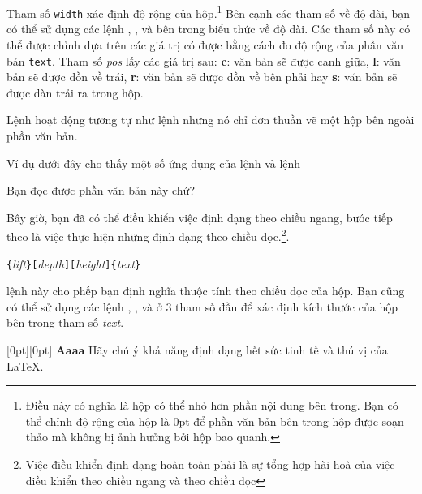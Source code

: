 \noindent Tham số \texttt{width} xác định độ rộng của
hộp.\footnote{Điều này có nghĩa là hộp có thể nhỏ hơn phần nội
dung bên trong. Bạn có thể chỉnh độ rộng của hộp là 0pt để phần
văn bản bên trong hộp được soạn thảo mà không bị ảnh hưởng bởi hộp
bao quanh.} Bên cạnh các tham số về độ dài, bạn có thể sử dụng các
lệnh , ,  và  bên
trong biểu thức về độ dài. Các tham số này có thể được chỉnh dựa
trên các giá trị có được bằng cách đo độ rộng của phần văn bản
\texttt{text}. Tham số \emph{pos} lấy các giá trị sau: \textbf{c}:
văn bản sẽ được canh giữa, \textbf{l}: văn bản sẽ được dồn về
trái, \textbf{r}: văn bản sẽ được dồn về bên phải hay \textbf{s}:
văn bản sẽ được dàn trải ra trong hộp.

Lệnh  hoạt động tương tự như lệnh  nhưng
nó chỉ đơn thuần vẽ một hộp bên ngoài phần văn bản.

Ví dụ dưới đây cho thấy một số ứng dụng của lệnh  và
lệnh 

\begin{example}
\par
{}\par
{} \par

 \par
{}
Bạn đọc được phần văn bản này chứ?
\end{example}

Bây giờ, bạn đã có thể điều khiển việc định dạng theo chiều ngang,
bước tiếp theo là việc thực hiện những định dạng theo chiều
dọc.\footnote{Việc điều khiển định dạng hoàn toàn phải là sự tổng
hợp hài hoà của việc điều khiển theo chiều ngang và theo chiều
dọc}.

\begin{lscommand}
\verb|{|\emph{lift}\verb|}[|\emph{depth}\verb|][|\emph{height}\verb|]{|\emph{text}\verb|}|
\end{lscommand}

\noindent lệnh này cho phếp bạn định nghĩa thuộc tính theo chiều
dọc của hộp. Bạn cũng có thể sử dụng các lệnh ,
,  và  ở 3 tham số đầu để xác
định kích thước của hộp bên trong tham số \emph{text}.

\begin{example}
\raisebox{0pt}[0pt][0pt]{\Large%
\textbf{Aaaa\raisebox{-0.3ex}{a}%
\raisebox{-0.7ex}{aa}%
\raisebox{-1.2ex}{r}%
\raisebox{-2.2ex}{g}%
\raisebox{-4.5ex}{h}}}
Hãy chú ý khả năng định
dạng hết sức tinh
tế và thú vị của \LaTeX{}.
\end{example}

